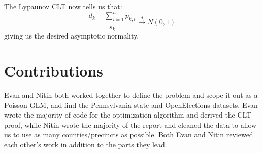 \documentclass[10pt,twocolumn,letterpaper]{article}
\begin{document}
The Lypaunov CLT now tells us that: 
\[ \frac{d_k - \sum_{i = 1}^{n} p_{k, i} }{s_k} \stackrel{d} \longrightarrow N(0, 1) \] 
giving us the desired asymptotic normality. 

\section{Contributions}
Evan and Nitin both worked together to define the problem and scope it out as a Poisson GLM, and find the Pennsylvania state and OpenElections datasets. Evan wrote the majority of code for the optimization algorithm and derived the CLT proof, while Nitin wrote the majority of the report and cleaned the data to allow us to use as many counties/precincts as possible. Both Evan and Nitin reviewed each other's work in addition to the parts they lead.

{\small


}
\end{document}
